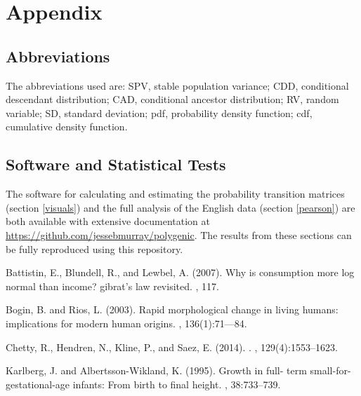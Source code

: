 \documentclass{svproc} %
\begin{document}
{%
\section{Appendix}

\subsection{Abbreviations}

The abbreviations used are: SPV, stable population variance; CDD, conditional descendant distribution; CAD, conditional ancestor distribution; RV, random variable; SD, standard deviation; pdf, probability density function; cdf, cumulative density function.


\subsection{Software and Statistical Tests} \label{links}
The software for calculating and estimating the probability transition matrices (section \ref{visuals}) and the full analysis of the English data (section \ref{pearson}) are both available with extensive documentation at \href{https://github.com/jessebmurray/polygenic}{https://github.com/jessebmurray/polygenic}. The results from these sections can be fully reproduced using this repository. 


\begin{thebibliography}{6}

Battistin, E., Blundell, R., and Lewbel, A. (2007).
\newblock Why is consumption more log normal than income? gibrat’s law
  revisited.
, 117.

Bogin, B. and Rios, L. (2003).
\newblock Rapid morphological change in living humans: implications for modern
  human origins.
, 136(1):71---84.

Chetty, R., Hendren, N., Kline, P., and Saez, E. (2014).
.
, 129(4):1553--1623.

Karlberg, J. and Albertsson-Wikland, K. (1995).
\newblock Growth in full- term small-for-gestational-age infants: From birth to
  final height.
, 38:733--739.


\end{thebibliography}}
\end{document}
